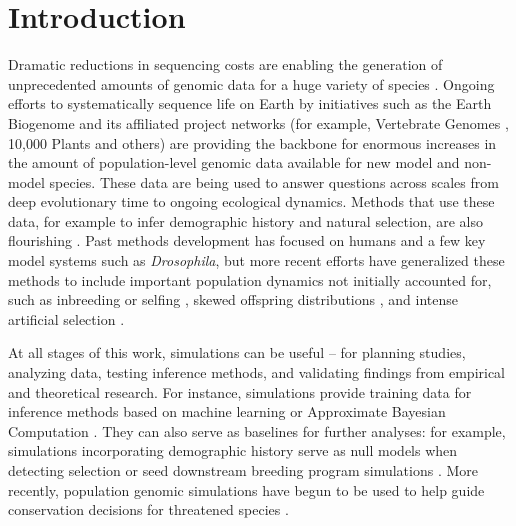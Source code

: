 \documentclass[hidelinks]{article}
\begin{document}
\section*{Introduction}
    \label{introduction}


Dramatic reductions in sequencing costs are enabling the generation of
unprecedented amounts of genomic data for a huge variety of species
\citep{Ellegren2014}. Ongoing efforts to systematically sequence life on
Earth by initiatives such as the Earth Biogenome \citep{Lewin2022} and its
affiliated project networks (for example, Vertebrate Genomes
\citep{Rhie2021}, 10,000 Plants \citep{Cheng2018} and others) are
providing the backbone for enormous increases in the amount of population-level genomic data
available for new model and non-model species.
These data are being used to answer questions across scales
from deep evolutionary time to ongoing ecological dynamics.
Methods that use these data, for example to infer demographic history and natural selection,
are also flourishing \citep{Beichman2018}.
Past methods development has focused on humans and a few key model systems such as \emph{Drosophila},
but more recent efforts have
generalized these methods to include important population dynamics not initially accounted for,
such as inbreeding or selfing \citep{Blischak2020}, skewed offspring
distributions \citep{Montano2016}, and intense artificial selection \citep{MacLeod2013, MacLeod2014}.

At all stages of this work, simulations can be useful --
for planning studies, analyzing data, testing inference methods,
and validating findings from empirical and theoretical research.
For instance, simulations provide training data
for inference methods based on machine learning \citep{Schrider2018} or
Approximate Bayesian Computation \citep{Csillery2010}. They can also serve as
baselines for further analyses: for example, simulations incorporating
demographic history serve as null models when detecting selection \citep{Hsieh2016a}
or seed downstream breeding program simulations \citep{Gaynor2020}.
More recently, population genomic simulations have begun
to be used to help guide conservation decisions for threatened species
\citep{Teixeira2021,kyriazis2022using}.
\end{document}
